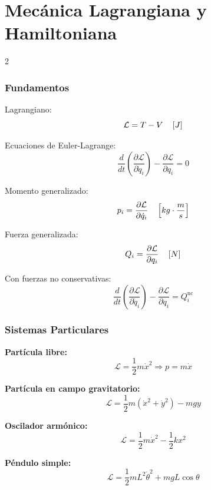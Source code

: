 \documentclass{article}
\begin{document}
\section{Mecánica Lagrangiana y Hamiltoniana}
\begin{multicols}{2}


\subsubsection*{Fundamentos}
\begin{itemform}
\item Lagrangiano:
$$\mathcal{L} = T - V \quad \left[J \right]$$

\item Ecuaciones de Euler-Lagrange:
$$\frac{d}{dt}\left(\frac{\partial \mathcal{L}}{\partial \dot{q}_i}\right) - \frac{\partial \mathcal{L}}{\partial q_i} = 0$$

\item Momento generalizado:
$$p_i = \frac{\partial \mathcal{L}}{\partial \dot{q}_i} \quad \left[kg\cdot\dfrac{m}{s} \right]$$

\item Fuerza generalizada:
$$Q_i = \frac{\partial \mathcal{L}}{\partial q_i} \quad \left[N \right]$$

\item Con fuerzas no conservativas:
$$\frac{d}{dt}\left(\frac{\partial \mathcal{L}}{\partial \dot{q}_i}\right) - \frac{\partial \mathcal{L}}{\partial q_i} = Q_i^{\text{nc}}$$
\end{itemform}

\subsubsection*{Sistemas Particulares}

\begin{itemform}
\item \textbf{Partícula libre:}
$$\mathcal{L} = \frac{1}{2}m\dot{x}^2 \Rightarrow p = m\dot{x}$$

\item \textbf{Partícula en campo gravitatorio:}
$$\mathcal{L} = \frac{1}{2}m(\dot{x}^2 + \dot{y}^2) - mgy$$

\item \textbf{Oscilador armónico:}
$$\mathcal{L} = \frac{1}{2}m\dot{x}^2 - \frac{1}{2}kx^2$$

\item \textbf{Péndulo simple:}
$$\mathcal{L} = \frac{1}{2}mL^2\dot{\theta}^2 + mgL\cos\theta$$


\end{itemform}
\end{multicols}
\end{document}
